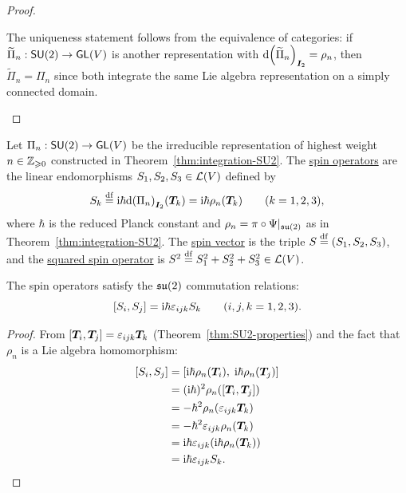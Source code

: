 \documentclass[11pt,reqno]{amsart}
\newcommand{\ii}{\mathrm{i}}
\begin{document}
\begin{proof}
\begin{enumerate}
The uniqueness statement follows from the equivalence of categories:
if $\widetilde{\Pi}_n:\operatorname{\mathsf{SU}}(2)\to\operatorname{\mathsf{GL}}(V)$ is another representation with
$\dd\Br{\widetilde{\Pi}_n}_{\bm I_2}=\rho_n$, then
$\widetilde{\Pi}_n=\Pi_n$ since both integrate the same Lie algebra
representation on a simply connected domain.

\end{enumerate}
\end{proof}

\begin{Def}\label{def:spin-operators}
Let $\Pi_n:\operatorname{\mathsf{SU}}(2)\to\operatorname{\mathsf{GL}}(V)$ be the irreducible representation of
highest weight $n\in\mathbb{Z}_{\geqslant 0}$ constructed in
Theorem~\ref{thm:integration-SU2}.
The \ul{spin operators} are the linear endomorphisms
$S_1,S_2,S_3\in\mathcal{L}(V)$ defined by
\[
S_k\df\ii\hbar
\dd\Br{\Pi_n}_{\bm I_2}\Br{\bm T_k}
=\ii\hbar\rho_n(\bm T_k)\qquad(k=1,2,3),
\]
where $\hbar$ is the reduced Planck constant and
$\rho_n=\pi\circ\Psi|_{\mathfrak{su}(2)}$ as in
Theorem~\ref{thm:integration-SU2}.
The \ul{spin vector} is the triple $S\stackrel{\mathrm{df}}{=}(S_1,S_2,S_3)$,
and the \ul{squared spin operator} is
$S^2\stackrel{\mathrm{df}}{=} S_1^2+S_2^2+S_3^2\in\mathcal{L}(V)$.
\end{Def}

\begin{Prop}\label{prop:spin-commutation}
The spin operators satisfy the $\mathfrak{su}(2)$ commutation relations:
\[
\SqBr{S_i,S_j}=\ii\hbar\eps_{ijk}S_k
\qquad(i,j,k=1,2,3).
\]
\end{Prop}
\begin{proof}
From $\SqBr{\bm T_i,\bm T_j}=\eps_{ijk}\bm T_k$
(Theorem~\ref{thm:SU2-properties}) and the fact that $\rho_n$ is a
Lie algebra homomorphism:
\[
\begin{aligned}
\SqBr{S_i,S_j}
&=\SqBr{\ii\hbar\rho_n(\bm T_i),\;\ii\hbar\rho_n(\bm T_j)} \\
&=(\ii\hbar)^2\rho_n\Br{\SqBr{\bm T_i,\bm T_j}}\\
&=-\hbar^2\rho_n\Br{\eps_{ijk}\bm T_k} \\
&=-\hbar^2\eps_{ijk}\rho_n(\bm T_k)\\
&=\ii\hbar\eps_{ijk}\Br{\ii\hbar\rho_n(\bm T_k)}\\
&=\ii\hbar\eps_{ijk}S_k.\\
\end{aligned}
\]
\end{proof}
\end{document}
